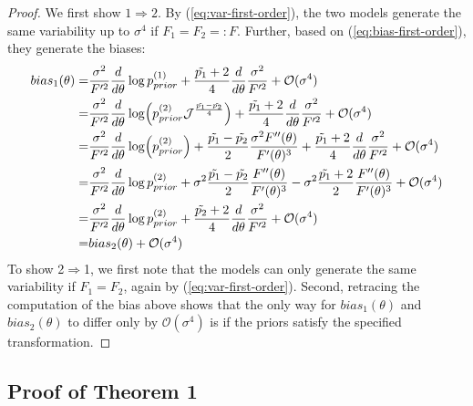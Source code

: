 \begin{proof}
    We first show $1 \Rightarrow 2$.
    By (\ref{eq:var-first-order}), the two models generate the same variability up to $\sigma^4$ if $F_1 = F_2 =: F$.
    Further, based on (\ref{eq:bias-first-order}), they generate the biases:
    \begin{align*}
bias_1(\theta) = & \frac{\sigma^2}{F'^2} \frac{d}{d\theta} \log p_{prior}^{(1)} + \frac{\tilde{p_1}+2}{4} \frac{d}{d\theta} \frac{\sigma^2}{F'^2}  + \mathcal{O}(\sigma^4) \\
= & \frac{\sigma^2}{F'^2} \frac{d}{d\theta} \log (p_{prior}^{(2)}  \mathcal{J}^{\frac{\tilde{p_1}-\tilde{p_2}}{4}}) + \frac{\tilde{p_1}+2}{4} \frac{d}{d\theta} \frac{\sigma^2}{F'^2}  + \mathcal{O}(\sigma^4) \\
= & \frac{\sigma^2}{F'^2} \frac{d}{d\theta} \log (p_{prior}^{(2)}) +   \frac{\tilde{p_1}-\tilde{p_2}}{2} \frac{\sigma^2 F''(\theta)}{F'(\theta)^3} + \frac{\tilde{p_1}+2}{4} \frac{d}{d\theta} \frac{\sigma^2}{F'^2}  + \mathcal{O}(\sigma^4) \\
= & \frac{\sigma^2}{F'^2} \frac{d}{d\theta} \log p_{prior}^{(2)}  + \sigma^2 {\frac{\tilde{p_1}-\tilde{p_2}}{2}} \frac{F''(\theta)}{F'(\theta)^3} - \sigma^2 \frac{\tilde{p_1}+2}{2} \frac{F''(\theta)}{F'(\theta)^3}  + \mathcal{O}(\sigma^4) \\
= & \frac{\sigma^2}{F'^2} \frac{d}{d\theta} \log p_{prior}^{(2)} + \frac{\tilde{p_2}+2}{4} \frac{d}{d\theta} \frac{\sigma^2}{F'^2}  + \mathcal{O}(\sigma^4) \\
= & bias_2(\theta) + \mathcal{O}(\sigma^4)
\end{align*}
To show 2$\Rightarrow$1, we first note that the models can only generate the same variability if $F_1=F_2$, again by (\ref{eq:var-first-order}).
Second, retracing the computation of the bias above shows that the only way for $bias_1(\theta)$ and $bias_2(\theta)$ to differ only by $\mathcal{O}(\sigma^4)$ is if the priors satisfy the specified transformation.
\end{proof}



\subsection{Proof of Theorem 1} 
\label{sec:proof-theorem-1}


